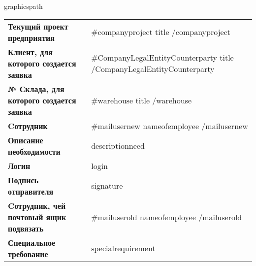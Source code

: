 

\newcommand{\parDoc}{Протокол Служебного расследования №09876543}
\newcommand{\childDoc}{Лист Аттестации №09876543}
\newcommand{\relatedDoc}{CОП №3456789}

\newcommand{\varInitiator}{Фурс C.Л.}
\newcommand{\varVisant}{Пижук В.М.}
\newcommand{\varApprover}{Павлова В.В.}
\newcommand{\varResponsible}{Иванов И.И.}
\newcommand{\varDoer}{Сидорова С.С.}

\newcommand{\initiatorPost}{Контролер качества}
\newcommand{\visantPost}{Главный инженер}
\newcommand{\approverPost}{Директор}
\newcommand{\responsibPost}{Начальник отдела качества}
\newcommand{\doerPost}{Менеджер по обучению}



{{graphicspath}}



\pagestyle{maintext}

\vspace{1mm}

\vspace{5mm}

\begin{tabu} to \textwidth {X X}
\textbf{Текущий проект предприятия}                   &  {{#companyproject}} {{title}} {{/companyproject}} \\ [2ex]
\textbf{Клиент, для которого создается заявка}        &  {{#CompanyLegalEntityCounterparty}} {{title}} {{/CompanyLegalEntityCounterparty}}  \\ [2ex]
\textbf{№ Склада, для которого создается заявка}      &  {{#warehouse}} {{title}} {{/warehouse}} \\  [2ex]
\textbf{Cотрудник}      &  {{#mailusernew}} {{nameofemployee}} {{/mailusernew}} \\  [2ex]
\textbf{Описание необходимости}      &  {{descriptionneed}} \\  [2ex]
\textbf{Логин}      &  {{login}} \\  [2ex]
\textbf{Подпись отправителя}      &  {{signature}} \\  [2ex]
\textbf{Cотрудник, чей почтовый ящик подвязать}   &  {{#mailuserold}} {{nameofemployee}} {{/mailuserold}} \\  [2ex]
\textbf{Специальное требование} &  {{specialrequirement}} \\  [2ex]
\end{tabu}



